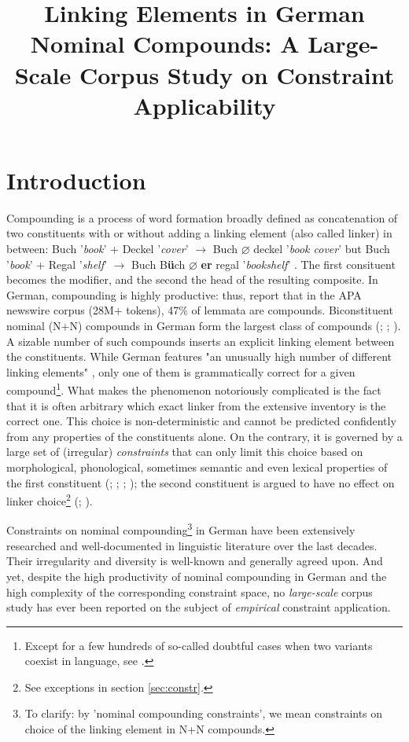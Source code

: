 \documentclass[10pt, a4paper]{article}
\title{Linking Elements in German Nominal Compounds: A Large-Scale Corpus Study on Constraint Applicability}
\newcommand{\zeroLinker}{\ensuremath{\boldsymbol{\varnothing}}}
\newcommand{\compEx}[7]{%
    #1 '\textit{#2}' + #4 '\textit{#5}'
    $\rightarrow$
    \if\relax\detokenize{#6}\relax
      #1%
    \else
      #6%
    \fi
    \if\relax\detokenize{#3}\relax
      \zeroLinker%
    \else
      \textbf{#3}%
    \fi
    \MakeLowercase{#4} '\textit{#7}'%
}
\begin{document}
\maketitleabstract



\section{Introduction}
\label{sec:intro}

Compounding is a process of word formation broadly defined as concatenation of two constituents with or without adding a linking element (also called linker) in between: \compEx{Buch}{book}{}{Deckel}{cover}{}{book cover} but \compEx{Buch}{book}{er}{Regal}{shelf}{B\textbf{ü}ch}{bookshelf}. The first consituent becomes the modifier, and the second the head of the resulting composite. In German, compounding is highly productive: thus, \citet{baroni_etal_2003} report that in the APA newswire corpus (28M+ tokens), 47\% of lemmata are compounds. Biconstituent nominal (N+N) compounds in German form the largest class of compounds (\citealp[53]{ortner_mueller-bollhagen_1991}; \citealp{scherer_2012}; \citealp{schluecker_2023}). A sizable number of such compounds inserts an explicit linking element between the constituents. While German features "an unusually high number of different linking elements" \citep{schaefer_pankratz_2018}, only one of them is grammatically correct for a given compound\footnote{Except for a few hundreds of so-called doubtful cases when two variants coexist in language, see \citep{nuebling_szczepaniak_2013}.}. What makes the phenomenon notoriously complicated is the fact that it is often arbitrary which exact linker from the extensive inventory is the correct one. This choice is non-deterministic and cannot be predicted confidently from any properties of the constituents alone. On the contrary, it is governed by a large set of (irregular) \textit{constraints} that can only limit this choice based on morphological, phonological, sometimes semantic and even lexical properties of the first constituent (\citealp[227]{eisenberg_2013}; \citealp{kuerschner_2005}; \citealp{libben_etal_2009}; \citealp{schaefer_pankratz_2018}); the second constituent is argued to have no effect on linker choice\footnote{See exceptions in section \ref{sec:constr}.} (\citealp{kuerschner_2005}; \citealp[56]{ortner_mueller-bollhagen_1991}).

Constraints on nominal compounding\footnote{To clarify: by 'nominal compounding constraints', we mean constraints on choice of the linking element in N+N compounds.} in German have been extensively researched and well-documented in linguistic literature over the last decades. Their irregularity and diversity is well-known and generally agreed upon. And yet, despite the high productivity of nominal compounding in German and the high complexity of the corresponding constraint space, no \textit{large-scale} corpus study has ever been reported on the subject of \textit{empirical} constraint application.
\end{document}
